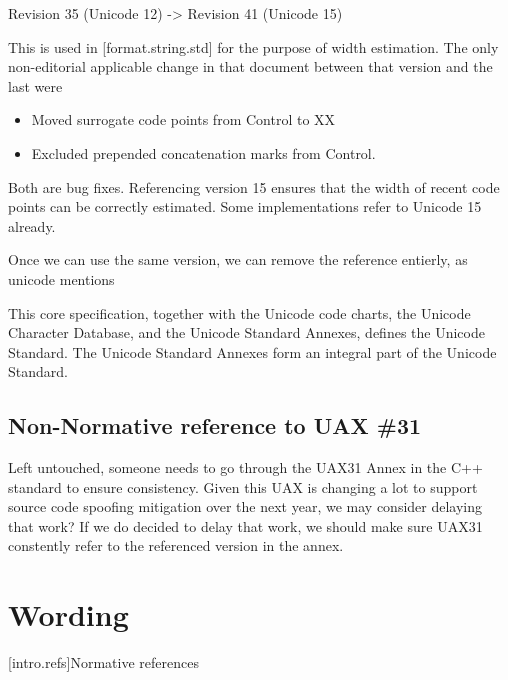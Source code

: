 \documentclass{wg21}
\begin{document}
Revision 35 (Unicode 12) -> Revision 41 (Unicode 15)

This is used in [format.string.std] for the purpose of width estimation.
The only non-editorial applicable change in that document between that version and the last were
\begin{itemize}
\item Moved surrogate code points from Control to XX
\item Excluded prepended concatenation marks from Control.
\end{itemize}

Both are bug fixes.
Referencing version 15 ensures that the width of recent code points can be correctly estimated.
Some implementations refer to Unicode 15 already.

Once we can use the same version, we can remove the reference entierly, as unicode mentions
\begin{quoteblock}
This core specification, together with the Unicode code charts, the Unicode Character Database, and the Unicode Standard Annexes, defines the Unicode Standard.
The Unicode Standard Annexes form an integral part of the Unicode Standard.
\end{quoteblock}

\subsection{Non-Normative reference to UAX \#31}

Left untouched, someone needs to go through the UAX31 Annex in the C++ standard to ensure consistency.
Given this UAX is changing a lot to support source code spoofing mitigation over the next year, we may consider
delaying that work?
If we do decided to delay that work, we should make sure UAX31 constently refer to the referenced version in the annex.


\section{Wording}

[intro.refs]{Normative references}%
%
\end{document}
